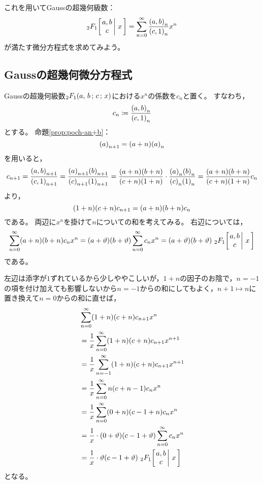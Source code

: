 \documentclass[a4paper,draft]{ltjsarticle}
\begin{document}
これを用いてGaussの超幾何級数：
\begin{equation}
    \Gauss{a}{b}{c}{x}=\sum_{n=0}^\infty \frac{\poch{a,b}{n}}{\poch{c,1}{n}}x^n
\end{equation}
が満たす微分方程式を求めてみよう。







\subsection{Gaussの超幾何微分方程式}\label{subsec:gauss-Gaussの超幾何微分方程式}
Gaussの超幾何級数$\sGauss{a}{b}{c}{x}$における$x^n$の係数を$c_n$と置く。
すなわち，
\begin{equation}
    c_n\coloneqq \frac{\poch{a,b}{n}}{\poch{c,1}{n}}
\end{equation}
とする。
命題\ref{prop:poch-an+b}：
\begin{equation}
    \poch{a}{n+1}=\pare{a+n}\poch{a}{n}
\end{equation}
を用いると，
\begin{equation}
    c_{n+1}=\frac{\poch{a,b}{n+1}}{\poch{c,1}{n+1}}=\frac{\poch{a}{n+1}\poch{b}{n+1}}{\poch{c}{n+1}\poch{1}{n+1}}=\frac{\pare{a+n}\pare{b+n}}{\pare{c+n}\pare{1+n}}\cdot \frac{\poch{a}{n}\poch{b}{n}}{\poch{c}{n}\poch{1}{n}}=\frac{\pare{a+n}\pare{b+n}}{\pare{c+n}\pare{1+n}}c_n
\end{equation}
より，
\begin{equation}
    \pare{1+n}\pare{c+n}c_{n+1} = \pare{a+n}\pare{b+n} c_n
\end{equation}
である。
両辺に$x^{n}$を掛けて$n$についての和を考えてみる。
右辺については，
\begin{equation}
    \sum_{n=0}^\infty \pare{a+n}\pare{b+n}c_n x^{n}=\pare{a+\vartheta}\pare{b+\vartheta}\sum_{n=0}^\infty c_n x^n=\pare{a+\vartheta}\pare{b+\vartheta}\ \Gauss{a}{b}{c}{x}
\end{equation}
である。

左辺は添字が$1$ずれているから少しややこしいが，$1+n$の因子のお陰で，$n=-1$の項を付け加えても影響しないから$n=-1$からの和にしてもよく，$n+1\mapsto n$に置き換えて$n=0$からの和に直せば，
\begin{align}
    &\sum_{n=0}^\infty \pare{1+n}\pare{c+n}c_{n+1} x^{n}
    \\
    &=\frac{1}{x}\sum_{n=0}^\infty \pare{1+n}\pare{c+n}c_{n+1} x^{n+1}
    \\
    &=\frac{1}{x}\sum_{n=-1}^\infty \pare{1+n}\pare{c+n}c_{n+1} x^{n+1}
    \\
    &=\frac{1}{x}\sum_{n=0}^\infty n\pare{c+n-1}c_{n} x^{n}
    \\
    &=\frac{1}{x}\sum_{n=0}^\infty \pare{0+n}\pare{c-1+n}c_{n} x^{n}
    \\
    &=\frac{1}{x}\cdot \pare{0+\vartheta} \pare{c-1+\vartheta}\sum_{n=0}^\infty c_n x^n
    \\
    &=\frac{1}{x}\cdot \vartheta\pare{c-1+\vartheta}\ \Gauss{a}{b}{c}{x}
\end{align}
となる。
\end{document}
